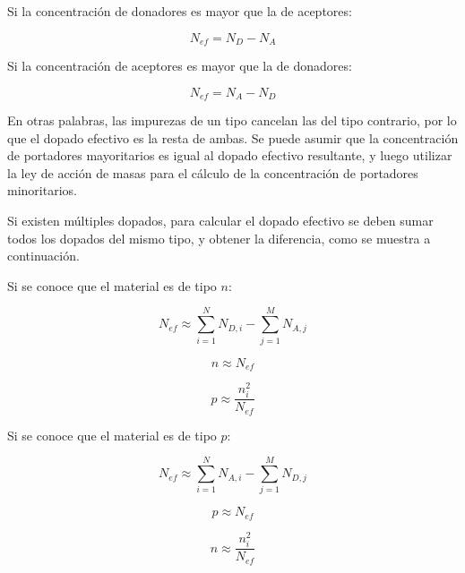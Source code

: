 Si la concentración de donadores es mayor que la de aceptores:

\[ N_{ef} = N_D - N_A \]

Si la concentración de aceptores es mayor que la de donadores:

\[ N_{ef} = N_A - N_D \]

En otras palabras, las impurezas de un tipo cancelan las del tipo contrario, por lo que el dopado efectivo es la resta de ambas. Se puede asumir que la concentración de portadores mayoritarios es igual al dopado efectivo resultante, y luego utilizar la ley de acción de masas para el cálculo de la concentración de portadores minoritarios.

Si existen múltiples dopados, para calcular el dopado efectivo se deben sumar todos los dopados del mismo tipo, y obtener la diferencia, como se muestra a continuación.

\vspace{3mm}
\begin{minipage}{8cm}
Si se conoce que el material es de tipo $n$:

\[ N_{ef} \approx \sum_{i=1}^{N} N_{D,i} - \sum_{j=1}^{M} N_{A,j} \]

\[ n \approx N_{ef} \]

\[ p \approx \dfrac{n_i^2}{N_{ef}} \]
\end{minipage}
\begin{minipage}{8cm}
Si se conoce que el material es de tipo $p$:

\[ N_{ef} \approx \sum_{i=1}^{N} N_{A,i} - \sum_{j=1}^{M} N_{D,j} \]

\[ p \approx N_{ef} \]

\[ n \approx \dfrac{n_i^2}{N_{ef}} \]
\end{minipage}

%
%
%
%

